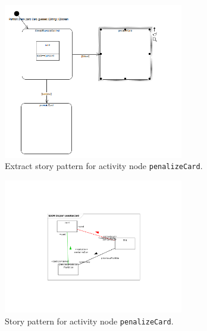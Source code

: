 \begin{figure}[htp]
\begin{center}
  \includegraphics[width=0.7\textwidth]{pics/sdmBilder/check/sdm31}
  \caption{Extract story pattern for activity node \texttt{penalizeCard}.}  
  \label{fig:sdm_check_start_penalize}
\end{center}
\end{figure}

\begin{figure}[htp]
\begin{center}
  \includegraphics[width=0.7\textwidth]{pics/sdmBilder/check/sdm38}
  \caption{Story pattern for activity node \texttt{penalizeCard}.}  
  \label{fig:sdm_check_complete_penalize}
\end{center}
\end{figure}

